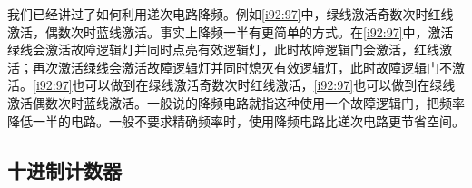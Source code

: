 我们已经讲过了如何利用递次电路降频。例如\autoref{i92:97}中，绿线激活奇数次时红线激活，偶数次时蓝线激活。事实上降频一半有更简单的方式。在\autoref{i92:97}中，激活绿线会激活故障逻辑灯并同时点亮有效逻辑灯，此时故障逻辑门会激活，红线激活；再次激活绿线会激活故障逻辑灯并同时熄灭有效逻辑灯，此时故障逻辑门不激活。\autoref{i92:97}也可以做到在绿线激活奇数次时红线激活，\autoref{i92:97}也可以做到在绿线激活偶数次时蓝线激活。一般说的降频电路就指这种使用一个故障逻辑门，把频率降低一半的电路。一般不要求精确频率时，使用降频电路比递次电路更节省空间。

\begin{figure}[!h]
\begin{center}
\qquad
{}
\qquad
{}
\end{center}
\caption{}
\label{i92:97}
\end{figure}

\subsection{十进制计数器}

